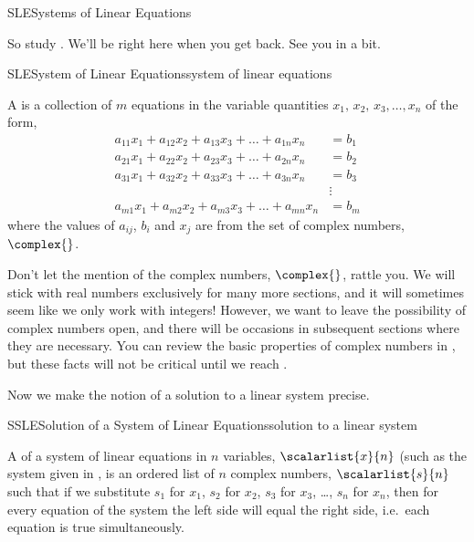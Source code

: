 \begin{subsect}{SLE}{Systems of Linear Equations}
\begin{para}
So study .  We'll be right here when you get back.  See you in a bit.\end{para}
%
\begin{definition}{SLE}{System of Linear Equations}{system of linear equations}
\begin{para}A  is a collection of $m$ equations in the variable quantities $x_1,\,x_2,\,x_3,\ldots,x_n$ of the form,
\begin{align*}
a_{11}x_1+a_{12}x_2+a_{13}x_3+\dots+a_{1n}x_n&=b_1\\
a_{21}x_1+a_{22}x_2+a_{23}x_3+\dots+a_{2n}x_n&=b_2\\
a_{31}x_1+a_{32}x_2+a_{33}x_3+\dots+a_{3n}x_n&=b_3\\
&\vdots\\
a_{m1}x_1+a_{m2}x_2+a_{m3}x_3+\dots+a_{mn}x_n&=b_m
\end{align*}
where the values of $a_{ij}$, $b_i$ and $x_j$ are from the set of complex numbers, $\complex{\null}$.\end{para}
\end{definition}
%
\begin{para}Don't let the mention of the complex numbers, $\complex{\null}$, rattle you.  We will stick with real numbers exclusively for many more sections, and it will sometimes seem like we only work with integers!  However, we want to leave the possibility of complex numbers open, and there will be occasions in subsequent sections where they are necessary.  You can review the basic properties of complex numbers in , but these facts will not be critical until we reach .\end{para}
%
\begin{para}Now we make the notion of a solution to a linear system precise.\end{para}
%
\begin{definition}{SSLE}{Solution of a System of Linear Equations}{solution to a linear system}
\begin{para}A  of a system of linear equations in $n$ variables, $\scalarlist{x}{n}$ (such as the system given in , is an ordered list of $n$ complex numbers, $\scalarlist{s}{n}$ such that if we substitute $s_1$ for $x_1$, $s_2$ for $x_2$, $s_3$ for $x_3$, \dots, $s_n$ for $x_n$,  then for every equation of the system the left side will equal the right side, i.e.\ each equation is true simultaneously.\end{para}

\end{definition}
\end{subsect}
